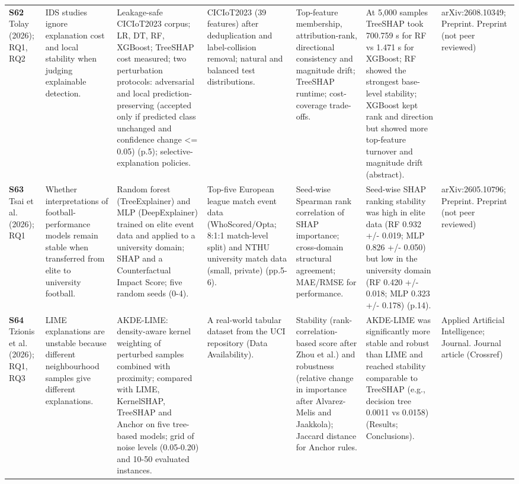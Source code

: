 \begin{longtable}{@{}P{1.55cm}P{2.9cm}P{4.5cm}P{3.2cm}P{3.4cm}P{4.6cm}P{3.6cm}@{}}
\textbf{S62} \cite{S62} Tolay (2026); RQ1, RQ2 & IDS studies ignore explanation cost and local stability when judging explainable detection. & Leakage-safe CICIoT2023 corpus; LR, DT, RF, XGBoost; TreeSHAP cost measured; two perturbation protocols: adversarial and local prediction-preserving (accepted only if predicted class unchanged and confidence change \textless{}= 0.05) (p.5); selective-explanation policies. & CICIoT2023 (39 features) after deduplication and label-collision removal; natural and balanced test distributions. & Top-feature membership, attribution-rank, directional consistency and magnitude drift; TreeSHAP runtime; cost-coverage trade-offs. & At 5,000 samples TreeSHAP took 700.759 s for RF vs 1.471 s for XGBoost; RF showed the strongest base-level stability; XGBoost kept rank and direction but showed more top-feature turnover and magnitude drift (abstract). & arXiv:2608.10349; Preprint. Preprint (not peer reviewed) \\
\textbf{S63} \cite{S63} Tsai et al. (2026); RQ1 & Whether interpretations of football-performance models remain stable when transferred from elite to university football. & Random forest (TreeExplainer) and MLP (DeepExplainer) trained on elite event data and applied to a university domain; SHAP and a Counterfactual Impact Score; five random seeds (0-4). & Top-five European league match event data (WhoScored/\allowbreak{}Opta; 8:1:1 match-level split) and NTHU university match data (small, private) (pp.5-6). & Seed-wise Spearman rank correlation of SHAP importance; cross-domain structural agreement; MAE/\allowbreak{}RMSE for performance. & Seed-wise SHAP ranking stability was high in elite data (RF 0.932 +/\allowbreak{}- 0.019; MLP 0.826 +/\allowbreak{}- 0.050) but low in the university domain (RF 0.420 +/\allowbreak{}- 0.018; MLP 0.323 +/\allowbreak{}- 0.178) (p.14). & arXiv:2605.10796; Preprint. Preprint (not peer reviewed) \\
\textbf{S64} \cite{S64} Tzionis et al. (2026); RQ1, RQ3 & LIME explanations are unstable because different neighbourhood samples give different explanations. & AKDE-LIME: density-aware kernel weighting of perturbed samples combined with proximity; compared with LIME, KernelSHAP, TreeSHAP and Anchor on five tree-based models; grid of noise levels (0.05-0.20) and 10-50 evaluated instances. & A real-world tabular dataset from the UCI repository (Data Availability). & Stability (rank-correlation-based score after Zhou et al.) and robustness (relative change in importance after Alvarez-Melis and Jaakkola); Jaccard distance for Anchor rules. & AKDE-LIME was significantly more stable and robust than LIME and reached stability comparable to TreeSHAP (e.g., decision tree 0.0011 vs 0.0158) (Results; Conclusions). & Applied Artificial Intelligence; Journal. Journal article (Crossref) \\

\end{longtable}
